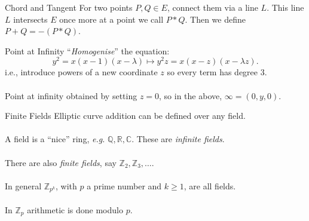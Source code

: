 \documentclass{beamer}
\begin{document}
\begin{frame}[t]{Chord and Tangent}
 	For two points $P, Q \in E$, connect them via a line $L$. This line $L$ intersects $E$ once more at a point we call $P \ast Q$. Then we define $P + Q = -(P \ast Q)$.
\end{frame}

\begin{frame}[t]{Point at Infinity}
	``\emph{Homogenise}'' the equation:
	$$
		y^{2} = x(x-1)(x-\lambda) \longmapsto y^{2}z = x(x-z)(x-\lambda z).
	$$
	i.e., introduce powers of a new coordinate $z$ so every term has degree 3. \\~\\
	
	Point at infinity obtained by setting $z = 0$, so in the above, $\infty = (0,y,0)$.
\end{frame}

\begin{frame}{Finite Fields}
	Elliptic curve addition can be defined over any field. \\~\\
	
	A field is a ``nice'' ring, \emph{e.g.} $\mathbb{Q}, \mathbb{R}, \mathbb{C}$. These are \emph{infinite fields}. \\~\\
	
	There are also \emph{finite fields}, say $\mathbb{Z}_{2}, \mathbb{Z}_{3},\ldots$. \\~\\
	
	In general $\mathbb{Z}_{p^{k}}$, with $p$ a prime number and $k\geq 1$, are all fields. \\~\\

	In $\mathbb{Z}_{p}$ arithmetic is done modulo $p$.
\end{frame}
\end{document}
